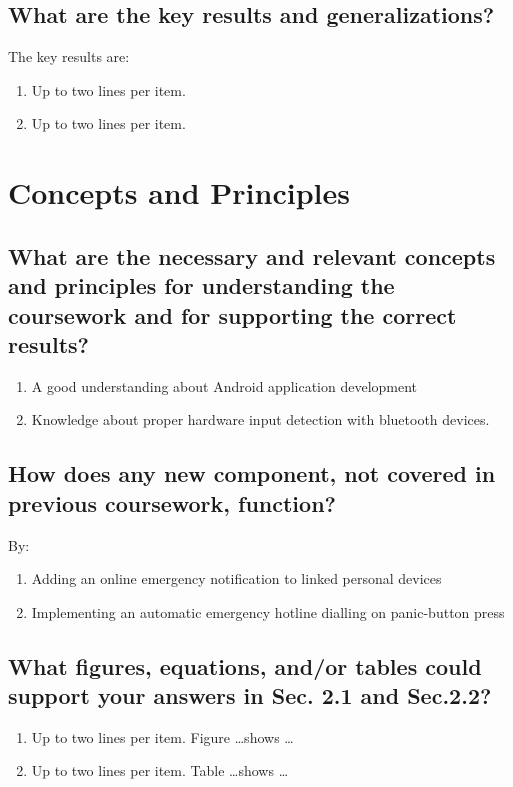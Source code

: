 \subsection{What are the key results and generalizations?}
The key results are:
\begin{enumerate}
	\item Up to two lines per item.
	\item Up to two lines per item.
\end{enumerate}

\section{Concepts and Principles}
\label{sec:concps}

\subsection{What are the necessary and relevant concepts and principles for understanding the coursework and for supporting the correct results?}
\begin{enumerate}
	\item A good understanding about Android application development 
	\item Knowledge about proper hardware input detection with bluetooth devices.
	
\end{enumerate}

\subsection{How does any new component, not covered in  previous coursework, function?}
By:
\begin{enumerate}
	\item Adding an online emergency notification to linked personal devices
	\item Implementing an automatic emergency hotline dialling on panic-button press
\end{enumerate}


\subsection{What figures, equations, and/or tables could support your answers in Sec. 2.1 and Sec.2.2?}
\begin{enumerate}
	\item Up to two lines per item. Figure \ldots shows \ldots
	\item Up to two lines per item. Table \ldots shows \ldots
\end{enumerate}

